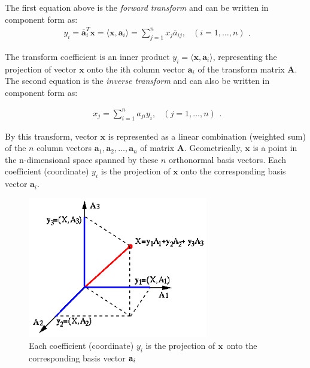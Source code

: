 \documentclass[10pt,b5paper,titlepage]{book}
\begin{document}
The first equation above is the \textit{forward transform} and can be written in component form as:
\begin{equation}
    \begin{array}{lr}
        y_{i} = \overline{\mathbf{a}}_{i}^{T} \mathbf{x}
        = \langle \mathbf{x}, \mathbf{a}_{i} \rangle
        = \sum_{j=1}^{n} x_{j} \overline{a}_{ij}, & (i = 1, \dots, n)
    \end{array}
.\end{equation}

The transform coefficient is an inner product $y_i = \langle \mathbf{x}, \mathbf{a}_i \rangle$, representing the projection of vector $\mathbf{x}$ onto the ith column vector  $\mathbf{a}_i$ of the transform matrix $\mathbf{A}$. The second equation is the \textit{inverse transform} and can also be written in component form as:

\begin{equation}
    \begin{array}{lr}
        x_j = \sum_{i=1}^{n} a_{ji} y_{i}, & (j = 1, \dots, n)
    \end{array}
.\end{equation}

By this transform, vector $\mathbf{x}$ is represented as a linear combination (weighted sum) of the $n$ column vectors  $\mathbf{a}_1, \mathbf{a}_2, \dots, \mathbf{a}_n$ of matrix $\mathbf{A}$. Geometrically,  $\mathbf{x}$ is a point in the n-dimensional space spanned by these $n$ orthonormal basis vectors. Each coefficient (coordinate)  $y_i$ is the projection of  $\mathbf{x}$ onto the corresponding basis vector $\mathbf{a}_i$.

\begin{figure}[htpb]
    \centering
    \includegraphics[width=0.7\textwidth]{./img/unitary_transform_1}
    \caption[Unitary transform]{Each coefficient (coordinate) $y_i$ is the projection of ${\bf x}$ onto the corresponding basis vector ${\bf a}_i$}
    \label{fig:unitary_transform_1}
\end{figure}
\end{document}
